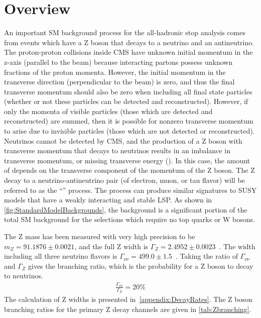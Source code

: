 
\section{Overview}
\label{sec:zinvisible-overview}

An important SM background process for the all-hadronic stop analysis comes from events which have a Z boson that decays to a neutrino and an antineutrino.
The proton-proton collisions inside CMS have unknown initial momentum in the z-axis (parallel to the beam) because interacting partons possess unknown fractions of the proton momenta.
However, the initial momentum in the transverse direction (perpendicular to the beam) is zero, and thus the final transverse momentum should also be zero when including all final state particles (whether or not these particles can be detected and reconstructed).
However, if only the momenta of visible particles (those which are detected and reconstructed) are summed, then it is possible for nonzero transverse momentum to arise due to invisible particles (those which are not detected or reconstructed).
Neutrinos cannot be detected by CMS, and the production of a Z boson with transverse momentum that decays to neutrinos results in an imbalance in transverse momentum, or missing transverse energy (\met).
In this case, the amount of \met depends on the transverse component of the momentum of the Z boson.
The Z decay to a neutrino-antineutrino pair (of electron, muon, or tau flavor) will be referred to as the ``\zinv'' process.
The \zinv process can produce similar signatures to SUSY models that have a weakly interacting and stable LSP.
As shown in \cref{fig:StandardModelBackgrounds}, the \zinv background is a significant portion of the total SM background for the selections which require no top quarks or W bosons.

The Z mass has been measured with very high precision to be $m_{Z} = 91.1876 \pm 0.0021$\GeV, and the full Z width is $\Gamma_{Z} = 2.4952 \pm 0.0023$\GeV~\cite{PDG2018}.
The \zinv width including all three neutrino flavors is $\Gamma_{\nu\nu} = 499.0 \pm 1.5$\MeV~\cite{PDG2018}.
Taking the ratio of $\Gamma_{\nu\nu}$ and $\Gamma_{Z}$ gives the branching ratio, which is the probability for a Z boson to decay to neutrinos.
\begin{align}
\frac{\Gamma_{\nu\nu}}{\Gamma_{Z}} = 20\%
\end{align}
The calculation of Z widths is presented in~\cref{appendix:DecayRates}.
The Z boson branching ratios for the primary Z decay channels are given in \cref{tab:Zbranching}.


